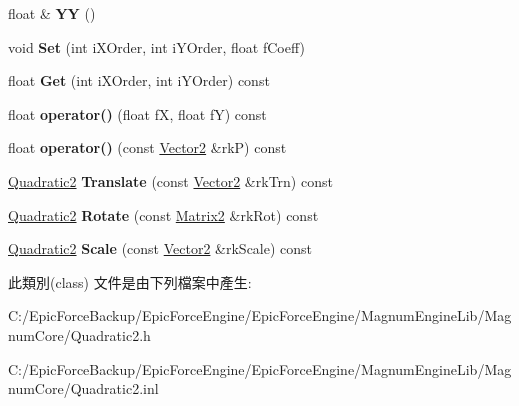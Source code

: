 \begin{DoxyCompactItemize}
\item 
float \& {\bfseries YY} ()\hypertarget{class_magnum_1_1_quadratic2_a40bb10511d8f31e854f7789db37356cf}{}\label{class_magnum_1_1_quadratic2_a40bb10511d8f31e854f7789db37356cf}

\item 
void {\bfseries Set} (int i\+X\+Order, int i\+Y\+Order, float f\+Coeff)\hypertarget{class_magnum_1_1_quadratic2_a2f5622be8b2299445e1d39a7514ee28c}{}\label{class_magnum_1_1_quadratic2_a2f5622be8b2299445e1d39a7514ee28c}

\item 
float {\bfseries Get} (int i\+X\+Order, int i\+Y\+Order) const \hypertarget{class_magnum_1_1_quadratic2_a476cbddad9dd4a3ae6b1df9775b54617}{}\label{class_magnum_1_1_quadratic2_a476cbddad9dd4a3ae6b1df9775b54617}

\item 
float {\bfseries operator()} (float fX, float fY) const \hypertarget{class_magnum_1_1_quadratic2_a4401977627fbcbb8e32be827c5e33bbe}{}\label{class_magnum_1_1_quadratic2_a4401977627fbcbb8e32be827c5e33bbe}

\item 
float {\bfseries operator()} (const \hyperlink{class_magnum_1_1_vector2}{Vector2} \&rkP) const \hypertarget{class_magnum_1_1_quadratic2_a1b495ec01289641a17ac643710308f69}{}\label{class_magnum_1_1_quadratic2_a1b495ec01289641a17ac643710308f69}

\item 
\hyperlink{class_magnum_1_1_quadratic2}{Quadratic2} {\bfseries Translate} (const \hyperlink{class_magnum_1_1_vector2}{Vector2} \&rk\+Trn) const \hypertarget{class_magnum_1_1_quadratic2_a974e3526894001b81a1eb7ef0a94c7c5}{}\label{class_magnum_1_1_quadratic2_a974e3526894001b81a1eb7ef0a94c7c5}

\item 
\hyperlink{class_magnum_1_1_quadratic2}{Quadratic2} {\bfseries Rotate} (const \hyperlink{class_magnum_1_1_matrix2}{Matrix2} \&rk\+Rot) const \hypertarget{class_magnum_1_1_quadratic2_a7a2b488eddd932248009b9cc1e5b778b}{}\label{class_magnum_1_1_quadratic2_a7a2b488eddd932248009b9cc1e5b778b}

\item 
\hyperlink{class_magnum_1_1_quadratic2}{Quadratic2} {\bfseries Scale} (const \hyperlink{class_magnum_1_1_vector2}{Vector2} \&rk\+Scale) const \hypertarget{class_magnum_1_1_quadratic2_abeeeb82edac8acb73fecf05974247b85}{}\label{class_magnum_1_1_quadratic2_abeeeb82edac8acb73fecf05974247b85}

\end{DoxyCompactItemize}


此類別(class) 文件是由下列檔案中產生\+:\begin{DoxyCompactItemize}
\item 
C\+:/\+Epic\+Force\+Backup/\+Epic\+Force\+Engine/\+Epic\+Force\+Engine/\+Magnum\+Engine\+Lib/\+Magnum\+Core/Quadratic2.\+h\item 
C\+:/\+Epic\+Force\+Backup/\+Epic\+Force\+Engine/\+Epic\+Force\+Engine/\+Magnum\+Engine\+Lib/\+Magnum\+Core/Quadratic2.\+inl\end{DoxyCompactItemize}
